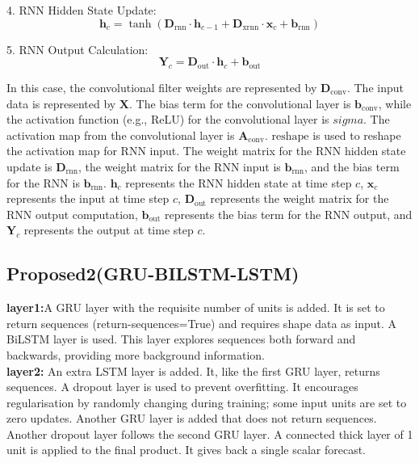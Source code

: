 4. RNN Hidden State Update:
\begin{equation}
\mathbf{h}_c = \tanh(\mathbf{D}_{\text{rnn}} \cdot \mathbf{h}_{c-1} + \mathbf{D}_{\text{xrnn}} \cdot \mathbf{x}_c + \mathbf{b}_{\text{rnn}})
\end{equation}

5. RNN Output Calculation:
\begin{equation}
\mathbf{Y}_c = \mathbf{D}_{\text{out}} \cdot \mathbf{h}_c + \mathbf{b}_{\text{out}}
\end{equation}

In this case, the convolutional filter weights are represented by $\mathbf{D}_\text{conv}$. The input data is represented by $\mathbf{X}$. The bias term for the convolutional layer is $\mathbf{b}_\text{conv}$, while the activation function (e.g., ReLU) for the convolutional layer is $sigma$. The activation map from the convolutional layer is $\mathbf{A}_\text{conv}$. $\text{reshape}$ is used to reshape the activation map for RNN input. The weight matrix for the RNN hidden state update is $\mathbf{D}_\text{rnn}$, the weight matrix for the RNN input is $\mathbf{b}_\text{rnn}$, and the bias term for the RNN is $\mathbf{b}_\text{rnn}$. $\mathbf{h}_c$ represents the RNN hidden state at time step $c$, $\mathbf{x}_c$ represents the input at time step $c$, $\mathbf{D}_\text{out}$ represents the weight matrix for the RNN output computation, $\mathbf{b}_\text{out}$ represents the bias term for the RNN output, and $\mathbf{Y}_c$ represents the output at time step $c$.



\subsection{Proposed2(GRU-BILSTM-LSTM)}
\textbf{layer1:}A GRU layer with the requisite number of units is added. It is set to return sequences (return-sequences=True) and requires shape data as input.
A BiLSTM layer is used. This layer explores sequences both forward and backwards, providing more background information.\\
\textbf{layer2:} An extra LSTM layer is added. It, like the first GRU layer, returns sequences. A dropout layer is used to prevent overfitting. It encourages regularisation by randomly changing during training; some input units are set to zero updates. Another GRU layer is added that does not return sequences.
Another dropout layer follows the second GRU layer. A connected thick layer of 1 unit is applied to the final product. It gives back a single scalar forecast.

